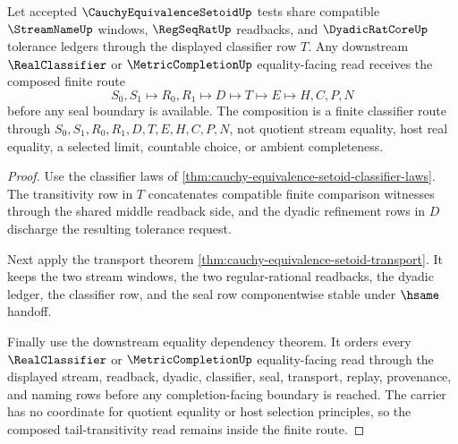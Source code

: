\begin{theorem}
\label{thm:cauchy-equivalence-setoid-tail-transitivity}
Let accepted $\CauchyEquivalenceSetoidUp$ tests share compatible $\StreamNameUp$ windows, $\RegSeqRatUp$ readbacks, and $\DyadicRatCoreUp$ tolerance ledgers through the displayed classifier row $T$. Any downstream $\RealClassifier$ or $\MetricCompletionUp$ equality-facing read receives the composed finite route
$$
S_0,S_1 \longmapsto R_0,R_1 \longmapsto D \longmapsto T \longmapsto E \longmapsto H,C,P,N
$$
before any seal boundary is available. The composition is a finite classifier route through $S_0,S_1,R_0,R_1,D,T,E,H,C,P,N$, not quotient stream equality, host real equality, a selected limit, countable choice, or ambient completeness.
\end{theorem}
\begin{proof}
Use the classifier laws of \autoref{thm:cauchy-equivalence-setoid-classifier-laws}. The transitivity row in $T$ concatenates compatible finite comparison witnesses through the shared middle readback side, and the dyadic refinement rows in $D$ discharge the resulting tolerance request.

Next apply the transport theorem \autoref{thm:cauchy-equivalence-setoid-transport}. It keeps the two stream windows, the two regular-rational readbacks, the dyadic ledger, the classifier row, and the seal row componentwise stable under $\hsame$ handoff.

Finally use the downstream equality dependency theorem. It orders every $\RealClassifier$ or $\MetricCompletionUp$ equality-facing read through the displayed stream, readback, dyadic, classifier, seal, transport, replay, provenance, and naming rows before any completion-facing boundary is reached. The carrier has no coordinate for quotient equality or host selection principles, so the composed tail-transitivity read remains inside the finite route.
\end{proof}

